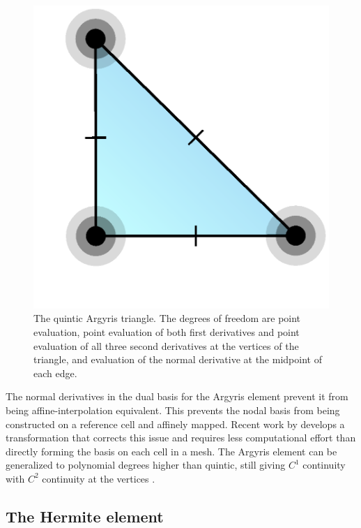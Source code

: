 \begin{figure}
  \centering
  \includegraphics[width=\smallfig]{chapters/kirby-6/png/ARG5_2d.png}
  \caption{The quintic Argyris triangle. The degrees of freedom are
    point evaluation, point evaluation of both first derivatives and
    point evaluation of all three second derivatives at the vertices
    of the triangle, and evaluation of the normal derivative at the
    midpoint of each edge.}
  \label{kirby-6:fig:argyris}
\end{figure}

The normal derivatives in the dual basis for the Argyris element
prevent it from being affine-interpolation equivalent. This prevents
the nodal basis from being constructed on a reference cell and
affinely mapped. Recent work by \citet{DominguezSayas2008} develops a
transformation that corrects this issue and requires less
computational effort than directly forming the basis on each cell in a
mesh. The Argyris element can be generalized to polynomial degrees
higher than quintic, still giving \( C^1 \) continuity with \( C^2 \)
continuity at the vertices \citep{SolinSegethDolevzel2004}.

\subsection{The Hermite element}

